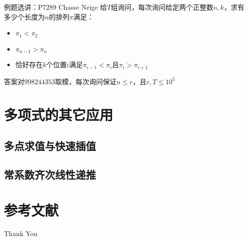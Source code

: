 \documentclass{beamer}
\begin{document}
\begin{frame}{例题选讲：P7289 Chasse Neige}
    \small
    给$T$组询问，每次询问给定两个正整数$n,k$，求有多少个长度为$n$的排列$\pi$满足：
    \begin{itemize}
        \item $\pi_1<\pi_2$
        \item $\pi_{n-1}>\pi_n$
        \item 恰好存在$k$个位置$i$满足$\pi_{i-1}<\pi_i$且$\pi_i>\pi_{i+1}$
    \end{itemize}

    答案对$998244353$取模，每次询问保证$n\leq r$，且$r,T\leq 10^5$
\end{frame}


\section{多项式的其它应用}

\subsection{多点求值与快速插值}

\subsection{常系数齐次线性递推}

\section{参考文献}

\begin{frame}[allowframebreaks]
    
    
    \nocite{*} %
\end{frame}


\begin{frame}
    \begin{center}
        {\Huge\calligra Thank You}
    \end{center}
\end{frame}
\end{document}
